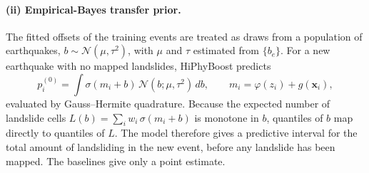 \paragraph{(ii) Empirical-Bayes transfer prior.} The fitted offsets of the training events are treated as draws from a population of earthquakes, $b\sim\mathcal{N}(\mu,\tau^2)$, with $\mu$ and $\tau$ estimated from $\{b_e\}$. For a new earthquake with no mapped landslides, HiPhyBoost predicts
\begin{equation}
p_i^{(0)} = \int \sigma(m_i + b)\,\mathcal{N}(b;\mu,\tau^2)\,db, \qquad m_i=\varphi(z_i)+g(\mathbf{x}_i),
\end{equation}
evaluated by Gauss--Hermite quadrature. Because the expected number of landslide cells $L(b)=\sum_i w_i\,\sigma(m_i+b)$ is monotone in $b$, quantiles of $b$ map directly to quantiles of $L$. The model therefore gives a predictive interval for the total amount of landsliding in the new event, before any landslide has been mapped. The baselines give only a point estimate.

